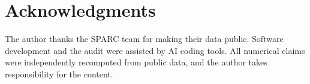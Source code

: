 \documentclass[11pt,a4paper]{article}
\begin{document}
\section*{Acknowledgments}
The author thanks the SPARC team for making their data public. Software development and the audit were assisted by AI coding tools. All numerical claims were independently recomputed from public data, and the author takes responsibility for the content.



\end{document}
